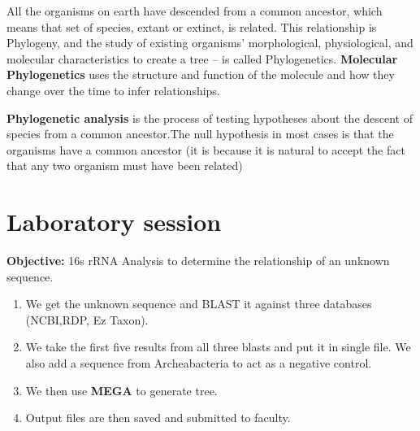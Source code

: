 \documentclass[12pt,a4paper]{report}
\begin{document}
All the organisms on earth have descended from a common
ancestor, which means that set of species, extant or extinct,
is related. This relationship is Phylogeny, and the study of existing
organisms' morphological, physiological, and molecular characteristics
to create a tree -- is called Phylogenetics. \textbf{Molecular Phylogenetics 
}uses the 
structure and function of the molecule and how they change over the time to 
infer relationships.

\textbf{Phylogenetic analysis }is the process of testing hypotheses about the
descent of species from a common ancestor.The null hypothesis in most cases is 
that the organisms have a common
ancestor (it is because it is natural to accept the fact that any two
organism must have been related)

\section*{Laboratory session}

\textbf{Objective:} 16s rRNA Analysis to determine the relationship of an 
unknown sequence.\mbox{}\\

\begin{enumerate}
	\item We get the unknown sequence and BLAST it against three databases 
	(NCBI,RDP, Ez Taxon).
    \item We take the first five results from all three blasts
and put it in single file. We also add a sequence from Archeabacteria
to act as a negative control.
	\item We then use \textbf{MEGA }to generate tree.
    \item Output files are then saved and submitted to faculty.
\end{enumerate}
\end{document}
